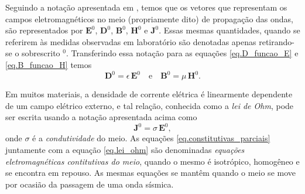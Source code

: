 Seguindo a nota\c{c}\~ao apresentada em \cite{eringen_1963}, temos que os vetores que representam os campos eletromagn\'eticos no meio (propriamente dito) de propaga\c{c}\~ao das ondas, s\~ao representados por $\mathbf{E}^0$, $\mathbf{D}^0$, $\mathbf{B}^0$, $\mathbf{H}^0$ e
$\mathbf{J}^0$. Essas mesmas quantidades, quando se referirem \`as medidas observadas em laborat\'orio s\~ao denotadas apenas retirando-se o sobrescrito $^0$. Transferindo essa nota\c{c}\~ao para as equa\c{c}\~oes \ref{eq.D_funcao_E} e \ref{eq.B_funcao_H} temos
\begin{equation}\label{eq.constitutivas_parciais}
\mathbf{D}^0=\epsilon\,\mathbf{E}^0\quad\text{e}\quad\mathbf{B}^0=\mu\,\mathbf{H}^0.
\end{equation}

Em muitos materiais, a densidade de corrente el\'etrica \'e linearmente dependente de um campo el\'etrico externo, e tal rela\c{c}\~ao, conhecida como a \textit{lei de Ohm}, pode ser escrita usando a nota\c{c}\~ao apresentada acima como
\begin{equation}\label{eq.lei_ohm}
\mathbf{J}^0=\sigma\,\mathbf{E}^0,
\end{equation}
onde $\sigma$ \'e a \textit{condutividade} do meio. As equa\c{c}\~oes \ref{eq.constitutivas_parciais} juntamente com a equa\c{c}\~ao \ref{eq.lei_ohm} s\~ao denominadas \textit{equa\c{c}\~oes eletromagn\'eticas contitutivas do meio}, quando o mesmo \'e isotr\'opico, homog\^eneo e se encontra em repouso. As mesmas equa\c{c}\~oes se mant\^em quando o meio se move por ocasi\~ao da passagem de uma onda s\'ismica. 

